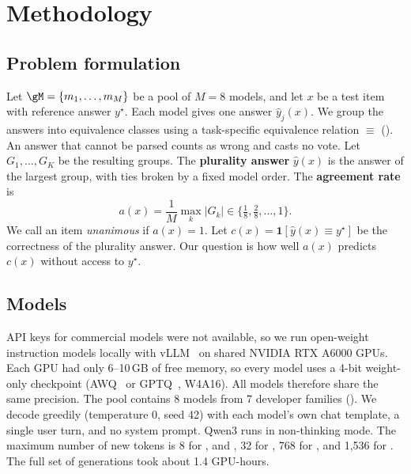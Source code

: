 \section{Methodology}
\label{sec:method}

\subsection{Problem formulation}
\label{sec:formulation}

Let $\gM = \{m_1, \dots, m_M\}$ be a pool of $M=8$ models, and let $x$ be a test item with reference answer $y^\star$.
Each model gives one answer $\hat y_j(x)$.
We group the answers into equivalence classes using a task-specific equivalence relation $\equiv$ ().
An answer that cannot be parsed counts as wrong and casts no vote.
Let $G_1, \dots, G_K$ be the resulting groups.
The {\bf plurality answer} $\hat y(x)$ is the answer of the largest group, with ties broken by a fixed model order.
The {\bf agreement rate} is
\begin{equation}
    a(x) = \frac{1}{M}\max_{k} |G_k| \in \Big\{\tfrac{1}{8}, \tfrac{2}{8}, \dots, 1\Big\}.
    \label{eq:agreement}
\end{equation}
We call an item {\em unanimous} if $a(x)=1$.
Let $c(x) = \mathbf{1}[\hat y(x) \equiv y^\star]$ be the correctness of the plurality answer.
Our question is how well $a(x)$ predicts $c(x)$ without access to $y^\star$.

\subsection{Models}
\label{sec:models}

API keys for commercial models were not available, so we run open-weight instruction models locally with vLLM~\citep{kwon2023vllm} on shared NVIDIA RTX A6000 GPUs.
Each GPU had only 6--10\,GB of free memory, so every model uses a 4-bit weight-only checkpoint (AWQ~\citep{lin2024awq} or GPTQ~\citep{frantar2023gptq}, W4A16).
All models therefore share the same precision.
The pool contains 8 models from 7 developer families ().
We decode greedily (temperature 0, seed 42) with each model's own chat template, a single user turn, and no system prompt.
Qwen3 runs in non-thinking mode.
The maximum number of new tokens is 8 for \mmlu, \ethics and \mmlutf, 32 for \triviaqa, 768 for \gsm, and 1,536 for \mathfive.
The full set of generations took about 1.4 GPU-hours.

